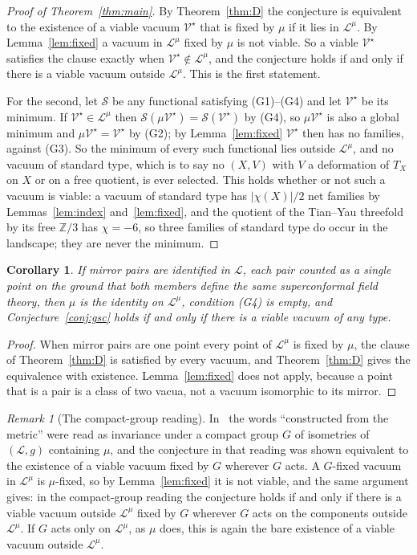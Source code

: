 \documentclass[11pt]{amsart}
\newtheorem{corollary}[theorem]{Corollary}
\theoremstyle{definition}
\theoremstyle{remark}
\newtheorem{remark}[theorem]{Remark}
\newcommand{\cL}{\mathcal{L}}
\newcommand{\cS}{\mathcal{S}}
\newcommand{\cV}{\mathcal{V}}
\newcommand{\Z}{\mathbb{Z}}
\begin{document}
\begin{proof}[Proof of Theorem~\ref{thm:main}]
By Theorem~\ref{thm:D} the conjecture is equivalent to the existence of a
viable vacuum $\cV^\star$ that is fixed by $\mu$ if it lies in $\cL^\mu$. By
Lemma~\ref{lem:fixed} a vacuum in $\cL^\mu$ fixed by $\mu$ is not viable. So a
viable $\cV^\star$ satisfies the clause exactly when $\cV^\star\notin\cL^\mu$,
and the conjecture holds if and only if there is a viable vacuum outside
$\cL^\mu$. This is the first statement.

For the second, let $\cS$ be any functional satisfying (G1)--(G4) and let
$\cV^\star$ be its minimum. If $\cV^\star\in\cL^\mu$ then
$\cS(\mu\cV^\star)=\cS(\cV^\star)$ by (G4), so $\mu\cV^\star$ is also a global
minimum and $\mu\cV^\star=\cV^\star$ by (G2); by Lemma~\ref{lem:fixed}
$\cV^\star$ then has no families, against (G3). So the minimum of every such
functional lies outside $\cL^\mu$, and no vacuum of standard type, which is to
say no $(X,V)$ with $V$ a deformation of $T_X$ on $X$ or on a free quotient, is
ever selected. This holds whether or not such a vacuum is viable: a vacuum of
standard type has $|\chi(X)|/2$ net families by Lemmas~\ref{lem:index}
and~\ref{lem:fixed}, and the quotient of the Tian--Yau threefold by its free
$\Z/3$ has $\chi=-6$, so three families of standard type do occur in the
landscape; they are never the minimum.
\end{proof}

\begin{corollary}\label{cor:two}
If mirror pairs are identified in $\cL$, each pair counted as a single point
on the ground that both members define the same superconformal field theory,
then $\mu$ is the identity on $\cL^\mu$, condition \textup{(G4)} is empty, and
Conjecture~\ref{conj:gsc} holds if and only if there is a viable vacuum of any
type.
\end{corollary}

\begin{proof}
When mirror pairs are one point every point of $\cL^\mu$ is fixed by $\mu$, the
clause of Theorem~\ref{thm:D} is satisfied by every vacuum, and
Theorem~\ref{thm:D} gives the equivalence with existence. Lemma~\ref{lem:fixed}
does not apply, because a point that is a pair is a class of two vacua, not a
vacuum isomorphic to its mirror.
\end{proof}

\begin{remark}[The compact-group reading]\label{rem:group}
In~\cite[Remark~23]{BB26} the words ``constructed from the metric'' were
read as invariance under a compact group $G$ of isometries of $(\cL,g)$
containing $\mu$, and the conjecture in that reading was shown equivalent to
the existence of a viable vacuum fixed by $G$ wherever $G$ acts. A $G$-fixed
vacuum in $\cL^\mu$ is $\mu$-fixed, so by Lemma~\ref{lem:fixed} it is not
viable, and the same argument gives: in the compact-group reading the
conjecture holds if and only if there is a viable vacuum outside $\cL^\mu$
fixed by $G$ wherever $G$ acts on the components outside $\cL^\mu$. If $G$
acts only on $\cL^\mu$, as $\mu$ does, this is again the bare existence of a
viable vacuum outside $\cL^\mu$.
\end{remark}
\end{document}
